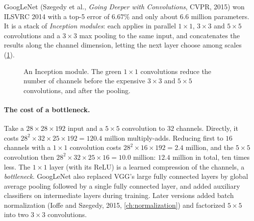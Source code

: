 \begin{notechapter}
GoogLeNet (Szegedy et al., \emph{Going Deeper with Convolutions}, CVPR, 2015) won ILSVRC 2014
with a top-5 error of $6.67\%$ and only about $6.6$ million parameters. It is a stack of \emph{Inception
modules}: each applies in parallel $1\times1$, $3\times3$ and $5\times5$ convolutions and a $3\times3$ max pooling to the same input,
and concatenates the results along the channel dimension, letting the next layer choose
among scales (\cref{cnn-architectures:fig:inception}).

\begin{figure}[ht]
\centering
{}
\caption{An Inception module. The green $1\times1$ convolutions reduce the number of channels before
the expensive $3\times3$ and $5\times5$ convolutions, and after the pooling.}
\label{cnn-architectures:fig:inception}
\end{figure}

\paragraph{The cost of a bottleneck.} Take a $28\times28\times192$ input and a $5\times5$ convolution to $32$ channels.
Directly, it costs $28^2\times32\times25\times192 = 120.4$ million multiply-adds. Reducing first to $16$ channels with a
$1\times1$ convolution costs $28^2\times16\times192 = 2.4$ million, and the $5\times5$ convolution then
$28^2\times32\times25\times16 = 10.0$ million: $12.4$ million in total, ten times less. The $1\times1$ layer (with its ReLU) is
a learned compression of the channels, a \emph{bottleneck}. GoogLeNet also replaced
VGG's large fully connected layers by global average pooling followed by a single fully
connected layer, and added auxiliary classifiers on intermediate layers during training.
Later versions added batch normalization (Ioffe and Szegedy, 2015, \cref{ch:normalization})
and factorized $5\times5$ into two $3\times3$ convolutions.


\end{notechapter}
